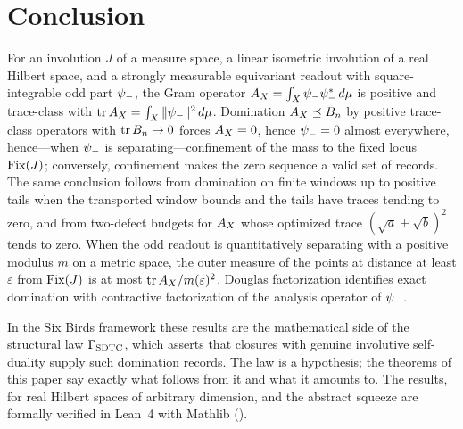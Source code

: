 \section{Conclusion}
\label{sec:conclusion}

For an involution \(J\) of a measure space, a linear isometric
involution of a real Hilbert space, and a strongly measurable
equivariant readout with square-integrable odd part \(\psi_{-}\), the Gram operator
\(A_{X}=\int_X\psi_{-}\psi_{-}^*\,d\mu\) is positive and trace-class with
\(\operatorname{tr}A_{X}=\int_X\|\psi_{-}\|^2\,d\mu\).  Domination
\(A_{X}\preceq B_n\) by positive trace-class operators with
\(\operatorname{tr} B_n\to0\) forces \(A_{X}=0\), hence \(\psi_{-}=0\) almost
everywhere, hence---when \(\psi_{-}\) is separating---confinement of the
mass to the fixed locus \(\operatorname{Fix}(J)\); conversely, confinement makes the
zero sequence a valid set of records.  The same conclusion follows from
domination on finite windows up to positive tails when the transported
window bounds and the tails have traces tending to zero, and from
two-defect budgets for \(A_{X}\) whose optimized trace
\((\sqrt a+\sqrt b)^2\) tends to zero.  When the odd readout is
quantitatively separating with a positive modulus \(m\) on a metric
space, the outer measure of the points at distance at least
\(\varepsilon\) from \(\operatorname{Fix}(J)\) is at most
\(\operatorname{tr}A_{X}/m(\varepsilon)^2\).  Douglas factorization identifies exact
domination with contractive factorization of the analysis operator of
\(\psi_{-}\).

In the Six Birds framework these results are the mathematical side of
the structural law \(\Gamma_{\mathrm{SDTC}}\), which asserts that closures with
genuine involutive self-duality supply such domination records.  The
law is a hypothesis; the theorems of this paper say exactly what
follows from it and what it amounts to.  The results, for real Hilbert spaces of arbitrary dimension, and the
abstract squeeze are formally verified in Lean~4 with Mathlib
().
